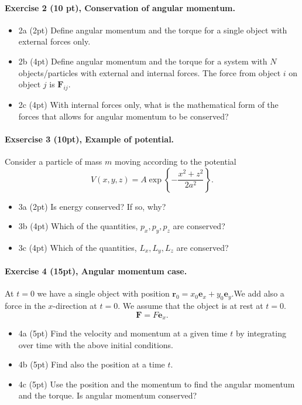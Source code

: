 \documentclass[%
oneside,                 %
final,                   %
10pt]{article}
\begin{document}
\noindent
\paragraph{Exercise 2 (10 pt), Conservation of angular momentum.}
\begin{itemize}
\item 2a (2pt) Define angular momentum and the torque for a single object with external forces only. 

\item 2b (4pt) Define angular momentum and the torque for a system with $N$ objects/particles  with external and internal forces. The force from object $i$ on object $j$ is $\bm{F}_{ij}$.

\item 2c (4pt) With internal forces only, what is the mathematical form of the forces that allows for angular momentum to be conserved? 
\end{itemize}

\noindent
\paragraph{Exsercise 3 (10pt), Example of potential.}
Consider a particle of mass $m$ moving according to the potential
\[
V(x,y,z)=A\exp\left\{-\frac{x^2+z^2}{2a^2}\right\}.
\]

\begin{itemize}
\item 3a (2pt) Is energy conserved? If so, why? 

\item 3b (4pt) Which of  the quantities, $p_x,p_y,p_z$ are conserved?

\item 3c (4pt) Which of  the quantities, $L_x,L_y,L_z$ are conserved?
\end{itemize}

\noindent
\paragraph{Exercise 4 (15pt), Angular momentum case.}
At $t=0$ we have a single object with position $\bm{r}_0=x_0\bm{e}_x+y_0\bm{e}_y$.We add also a force in the $x$-direction at $t=0$. We assume that the object is at rest at $t=0$. 
\[
\bm{F} = F\bm{e}_x.
\]

\begin{itemize}
\item 4a (5pt) Find the velocity and momentum at a given time $t$ by integrating over time with the above initial conditions.

\item 4b (5pt) Find also the position at a time $t$. 

\item 4c (5pt) Use the position and the momentum to find the angular momentum and the torque. Is angular momentum conserved?
\end{itemize}
\end{document}

